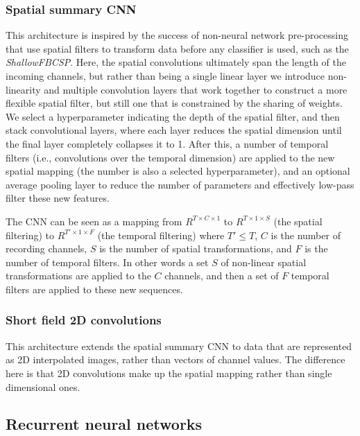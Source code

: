 \documentclass[utf8]{frontiersSCNS} %
\begin{document}
\subsubsection{Spatial summary CNN} \label{sec:scnn}

This architecture is inspired by the success of non-neural network pre-processing that use spatial filters to transform data before any classifier is used, such as the \emph{ShallowFBCSP}. Here, the spatial convolutions ultimately span the length of the incoming channels, but rather than being a single linear layer we introduce non-linearity and multiple convolution layers that work together to construct a more flexible spatial filter, but still one that is constrained by the sharing of weights. We select a hyperparameter indicating the depth of the spatial filter, and then stack convolutional layers, where each layer reduces the spatial dimension until the final layer completely collapses it to 1. After this, a number of temporal filters (i.e., convolutions over the temporal dimension) are applied to the new spatial mapping (the number is also a selected hyperparameter), and an optional average pooling layer to reduce the number of parameters and effectively low-pass filter these new features.

The CNN can be seen as a mapping from $R^{T \times C \times 1}$ to $R^{T \times 1 \times S}$ (the spatial filtering) to $R^{T' \times 1 \times F }$ (the temporal filtering) where $T' \leq T$, $C$ is the number of recording channels, $S$ is the number of spatial transformations, and $F$ is the number of temporal filters. In other words a set $S$ of non-linear spatial transformations are applied to the $C$ channels, and then a set of $F$ temporal filters are applied to these new sequences. 

\subsubsection{Short field 2D convolutions}

This architecture extends the spatial summary CNN to data that are represented as 2D interpolated images, rather than vectors of channel values. The difference here is that 2D convolutions make up the spatial mapping rather than single dimensional ones.
 
\subsection{Recurrent neural networks} \label{sec:rnns}
\end{document}
